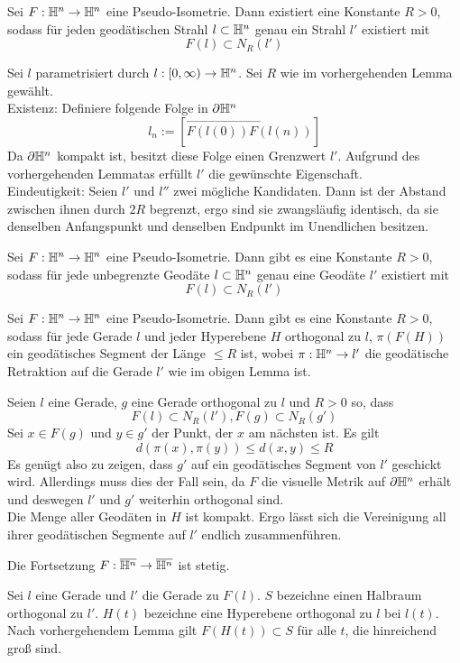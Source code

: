 \documentclass{book}
\begin{document}
\Lem{}
Sei $F : \mathbb{H}^n \overset{}{\rightarrow} \mathbb{H}^n$ eine Pseudo-Isometrie. Dann existiert eine Konstante $R > 0$, sodass für jeden geodätischen Strahl $l\subset \mathbb{H}^n$ genau ein Strahl $l'$ existiert mit
\[ F(l) \subset N_R(l') \]
\begin{Beweis}{}
	Sei $l$ parametrisiert durch $l : [0,\infty) \overset{{}}{\rightarrow} \mathbb{H}^n$. Sei $R$ wie im vorhergehenden Lemma gewählt.\\
	Existenz: Definiere folgende Folge in $\partial \mathbb{H}^n$
	\[ l_n := [\overrightarrow{F(l(0)) F(l(n)) } ] \]
	Da $\partial \mathbb{H}^n$ kompakt ist, besitzt diese Folge einen Grenzwert $l'$. Aufgrund des vorhergehenden Lemmatas erfüllt $l'$ die gewünschte Eigenschaft.\\
	Eindeutigkeit: Seien $l'$ und $l''$ zwei mögliche Kandidaten. Dann ist der Abstand zwischen ihnen durch $2R$ begrenzt, ergo sind sie zwangsläufig identisch, da sie denselben Anfangspunkt und denselben Endpunkt im Unendlichen besitzen.
\end{Beweis}

\Lem{}
Sei $F : \mathbb{H}^n \overset{}{\rightarrow} \mathbb{H}^n$ eine Pseudo-Isometrie. Dann gibt es eine Konstante $R > 0$, sodass für jede unbegrenzte Geodäte $l\subset \mathbb{H}^n$ genau eine Geodäte $l'$ existiert mit
\[ F(l) \subset N_R(l') \]

\Lem{}
Sei $F : \mathbb{H}^n \overset{}{\rightarrow} \mathbb{H}^n$ eine Pseudo-Isometrie. Dann gibt es eine Konstante $R > 0$, sodass für jede Gerade $l$ und jeder Hyperebene $H$ orthogonal zu $l$, $\pi(F(H))$ ein geodätisches Segment der Länge $\leq R$ ist, wobei $\pi : \mathbb{H}^n \overset{}{\rightarrow} l'$ die geodätische Retraktion auf die Gerade $l'$ wie im obigen Lemma ist.
\begin{Beweis}{}
	Seien $l$ eine Gerade, $g$ eine Gerade orthogonal zu $l$ und $R> 0$ so, dass
	\[ F(l) \subset N_R(l'), F(g) \subset N_R(g') \]
Sei $x \in F(g)$ und $y\in g'$ der Punkt, der $x$ am nächsten ist. Es gilt
\[ d(\pi(x), \pi(y)) \leq d(x, y) \leq R \]
Es genügt also zu zeigen, dass $g'$ auf ein geodätisches Segment von $l'$ geschickt wird. Allerdings muss dies der Fall sein, da $F$ die visuelle Metrik auf $\partial \mathbb{H}^n$ erhält und deswegen $l'$ und $g'$ weiterhin orthogonal sind.\\
Die Menge aller Geodäten in $H$ ist kompakt. Ergo lässt sich die Vereinigung all ihrer geodätischen Segmente auf $l'$ endlich zusammenführen.
\end{Beweis}

\Lem{}
Die Fortsetzung $F : \overline{\mathbb{H}^n} \overset{}{\rightarrow} \overline{\mathbb{H}^n}$ ist stetig.
\begin{Beweis}{}
	Sei $l$ eine Gerade und $l'$ die Gerade zu $F(l)$. $S$ bezeichne einen Halbraum orthogonal zu $l'$. $H(t)$ bezeichne eine Hyperebene orthogonal zu $l$ bei $l(t)$. Nach vorhergehendem Lemma gilt $F(H(t)) \subset S$ für alle $t$, die hinreichend groß sind.
\end{Beweis}
\end{document}
